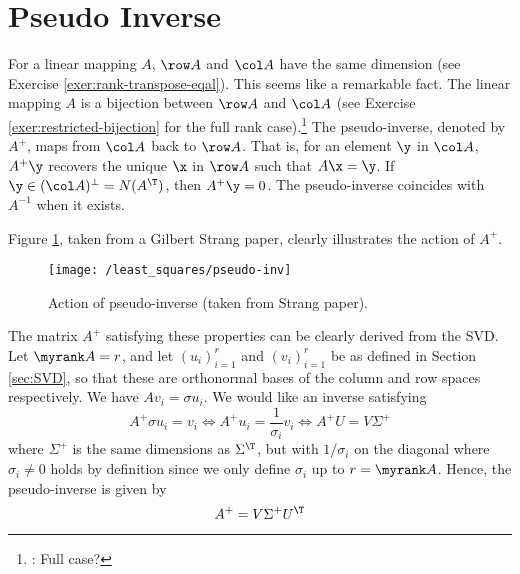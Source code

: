%


\section{Pseudo Inverse} \label{sec:pseudo-inv}

For a linear mapping $A$, $\row A$ and $\col A$ have the same dimension (see Exercise \ref{exer:rank-transpose-eqal}). This seems like a remarkable fact.
The linear mapping $A$ is a bijection between $\row A$ and $\col A$ (see Exercise \ref{exer:restricted-bijection} for the full rank case).\footnote{: Full case?} The pseudo-inverse, denoted by $A^+$, maps from $\col A$ back to $\row A$. That is, for an element $\y$ in $\col A$, $A^+\y$ recovers the unique $\x$ in $\row A$ such that $A \x = \y$. If $\y\in (\col A)^{\perp} = N(A^\T)$, then $A^{+}\y=0$. The pseudo-inverse coincides with $A^{-1}$ when it exists. 

Figure \ref{fig:pseudo-inv}, taken from a Gilbert Strang paper, clearly illustrates the action of $A^+$. 

\begin{figure} \label{fig:pseudo-inv}
\centering
\texttt{[image: /least\_squares/pseudo-inv]}
\caption{Action of pseudo-inverse (taken from Strang paper).}
\end{figure}

The matrix $A^+$ satisfying these properties can be clearly derived from the SVD. Let $\myrank A = r$, and let $(u_i)_{i=1}^r$ and $(v_i)_{i=1}^r$ be as defined in Section \ref{sec:SVD}, so that these are orthonormal bases of the column and row spaces respectively. We have $Av_i = \sigma u_i$. We would like an inverse satisfying 
$$
A^+ \sigma u_i = v_i \iff A^+ u_i = \frac{1}{\sigma_i} v_i \iff A^+ U = V\Sigma^+
$$
where $\Sigma^+$ is the same dimensions as $\Sigma^\T$, but with $1/\sigma_i$ on the diagonal where $\sigma_i \not= 0$ holds by definition since we only define $\sigma_i$ up to $r=\myrank A$. 
Hence, the pseudo-inverse is given by 
\begin{equation}
A^+ = V\Sigma^+ U^\T
\end{equation}

